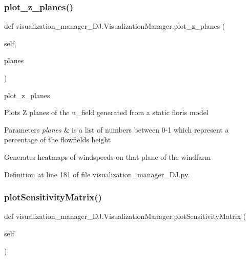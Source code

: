 \subsubsection{\texorpdfstring{plot\+\_\+z\+\_\+planes()}{plot\_z\_planes()}}
{\footnotesize\ttfamily def visualization\+\_\+manager\+\_\+\+D\+J.\+Visualization\+Manager.\+plot\+\_\+z\+\_\+planes (\begin{DoxyParamCaption}\item[{}]{self,  }\item[{}]{planes }\end{DoxyParamCaption})}



plot\+\_\+z\+\_\+planes 

Plots Z planes of the u\+\_\+field generated from a static floris model


\begin{DoxyParams}{Parameters}
{\em planes} & is a list of numbers between 0-\/1 which represent a percentage of the flowfield\textquotesingle{}s height\\
\hline
\end{DoxyParams}
Generates heatmaps of windspeeds on that plane of the windfarm 

Definition at line 181 of file visualization\+\_\+manager\+\_\+\+D\+J.\+py.

\mbox{\label{classvisualization__manager___d_j_1_1_visualization_manager_a32793e43e3e04b3819dea7740e5b9ca1}} 
\subsubsection{\texorpdfstring{plot\+Sensitivity\+Matrix()}{plotSensitivityMatrix()}}
{\footnotesize\ttfamily def visualization\+\_\+manager\+\_\+\+D\+J.\+Visualization\+Manager.\+plot\+Sensitivity\+Matrix (\begin{DoxyParamCaption}\item[{}]{self }\end{DoxyParamCaption})}



